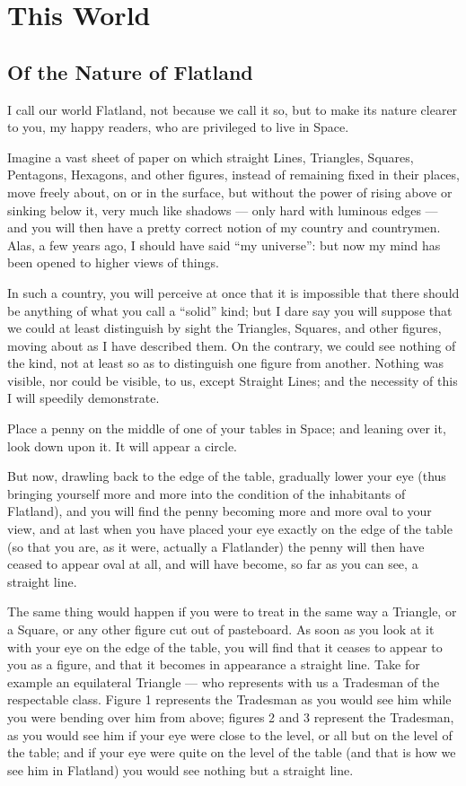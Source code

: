 \documentclass[12pt, a4paper, oneside]{memoir}
\begin{document}
\mainmatter

\part{This World}
\chapter{Of the Nature of Flatland} I call our world Flatland, not because we
call it so, but to make its nature clearer to you, my happy readers, who are
privileged to live in Space.

Imagine a vast sheet of paper on which straight Lines, Triangles, Squares,
Pentagons, Hexagons, and other figures, instead of remaining fixed in their
places, move freely about, on or in the surface, but without the power of
rising above or sinking below it, very much like shadows --- only hard with
luminous edges --- and you will then have a pretty correct notion of my country
and countrymen. Alas, a few years ago, I should have said ``my universe'': but
now my mind has been opened to higher views of things.

In such a country, you will perceive at once that it is impossible that there
should be anything of what you call a ``solid'' kind; but I dare say you will
suppose that we could at least distinguish by sight the Triangles, Squares,
and other figures, moving about as I have described them. On the contrary, we
could see nothing of the kind, not at least so as to distinguish one figure
from another. Nothing was visible, nor could be visible, to us, except
Straight Lines; and the necessity of this I will speedily demonstrate.

Place a penny on the middle of one of your tables in Space; and leaning over
it, look down upon it. It will appear a circle.

But now, drawling back to the edge of the table, gradually lower your eye
(thus bringing yourself more and more into the condition of the inhabitants of
Flatland), and you will find the penny becoming more and more oval to your
view, and at last when you have placed your eye exactly on the edge of the
table (so that you are, as it were, actually a Flatlander) the penny will then
have ceased to appear oval at all, and will have become, so far as you can
see, a straight line.

The same thing would happen if you were to treat in the same way a Triangle,
or a Square, or any other figure cut out of pasteboard. As soon as you look at
it with your eye on the edge of the table, you will find that it ceases to
appear to you as a figure, and that it becomes in appearance a straight line.
Take for example an equilateral Triangle --- who represents with us a Tradesman
of the respectable class. Figure 1 represents the Tradesman as you would see
him while you were bending over him from above; figures 2 and 3 represent the
Tradesman, as you would see him if your eye were close to the level, or all
but on the level of the table; and if your eye were quite on the level of the
table (and that is how we see him in Flatland) you would see nothing but a
straight line.
\end{document}
